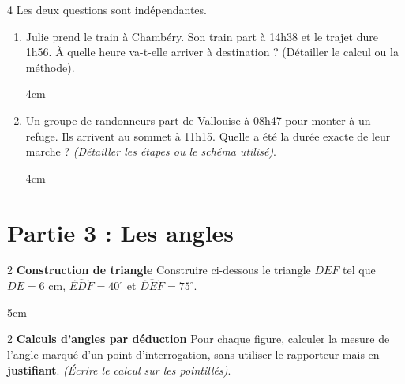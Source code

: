 \documentclass[a4paper]{book}
\begin{document}
{    
    \begin{exerciceNote}{4}
        Les deux questions sont indépendantes.
        \begin{enumerate}[leftmargin=*]
            \item Julie prend le train à Chambéry. Son train part à 14h38 et le trajet dure 1h56.
            À quelle heure va-t-elle arriver à destination ? (Détailler le calcul ou la méthode).
            \begin{ZoneReponse}{4cm}
            \end{ZoneReponse}

            \item Un groupe de randonneurs part de Vallouise à 08h47 pour monter à un refuge. Ils arrivent au sommet à 11h15.
            Quelle a été la durée exacte de leur marche ? \textit{(Détailler les étapes ou le schéma utilisé)}.
            
            \begin{ZoneReponse}{4cm}
            \end{ZoneReponse}
        \end{enumerate}
    \end{exerciceNote}

    
\section*{Partie 3 : Les angles}
    
    \begin{exerciceNote}{2}
        \textbf{Construction de triangle} \newline
        Construire ci-dessous le triangle $DEF$ tel que $DE = 6\text{ cm}$, $\widehat{EDF} = 40^\circ$ et $\widehat{DEF} = 75^\circ$.
        \begin{ZoneReponse}{5cm}
        \end{ZoneReponse}
    \end{exerciceNote}

    
    \begin{exerciceNote}{2}
        \textbf{Calculs d'angles par déduction} \newline
        Pour chaque figure, calculer la mesure de l'angle marqué d'un point d'interrogation, sans utiliser le rapporteur mais en \textbf{justifiant}. \textit{(Écrire le calcul sur les pointillés)}.
        \vspace{0.3cm}
        

\end{exerciceNote}}
\end{document}
